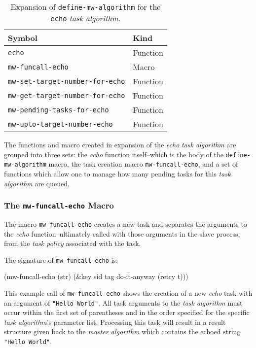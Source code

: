 \documentclass[titlepage,12pt]{book}
\newcommand{\ma}{\textit{master algorithm}\xspace}
\newcommand{\ta}{\textit{task algorithm}\xspace}
\newcommand{\tp}{\textit{task policy}\xspace}
\newcommand{\func}[1]{\mbox{\texttt{#1}}\xspace}
\newcommand{\macro}[1]{\mbox{\texttt{#1}}\xspace}
\newcommand{\bold}[1]{\textbf{#1}\xspace}
\begin{document}
\begin{table}[hbt]
\begin{center}
\begin{tabular}{||l|l||} \hline
\bold{Symbol}							& \bold{Kind} \\ \hline
\func{echo}								& Function \\ \hline
\macro{mw-funcall-echo}					& Macro \\ \hline
\func{mw-set-target-number-for-echo}	& Function \\ \hline
\func{mw-get-target-number-for-echo}	& Function \\ \hline
\func{mw-pending-tasks-for-echo}		& Function \\ \hline
\func{mw-upto-target-number-echo}		& Function \\ \hline
\end{tabular}
\caption{\label{expanded-define-mw-algorithm}
		Expansion of \macro{define-mw-algorithm} for the \texttt{echo} \ta.}
\end{center}
\end{table}

The functions and macro created in expansion of the \emph{echo} \ta
are grouped into three sets: the \emph{echo} function itself--which is
the body of the \macro{define-mw-algorithm} macro, the task creation
macro \macro{mw-funcall-echo}, and a set of functions which allow
one to manage how many pending tasks for this \ta are queued.

\subsubsection{The \macro{mw-funcall-echo} Macro}

The macro \macro{mw-funcall-echo} creates a new task and separates
the arguments to the \textit{echo} function--ultimately called with
those arguments in the slave process, from the \tp associated with
the task.

The signature of \macro{mw-funcall-echo} is:

\begin{barelisp}
(mw-funcall-echo (str) 
                 (&key sid tag do-it-anyway (retry t)))
\end{barelisp}

This example call of \macro{mw-funcall-echo} shows the creation of a
new \textit{echo} task with an argument of \texttt{"Hello World"}.
All task arguments to the \ta must occur within the first set of
parentheses and in the order specified for the specific {\ta}'s
parameter list.  Processing this task will result in a result
structure given back to the \ma which contains the echoed string
\texttt{"Hello World"}.
\end{document}
